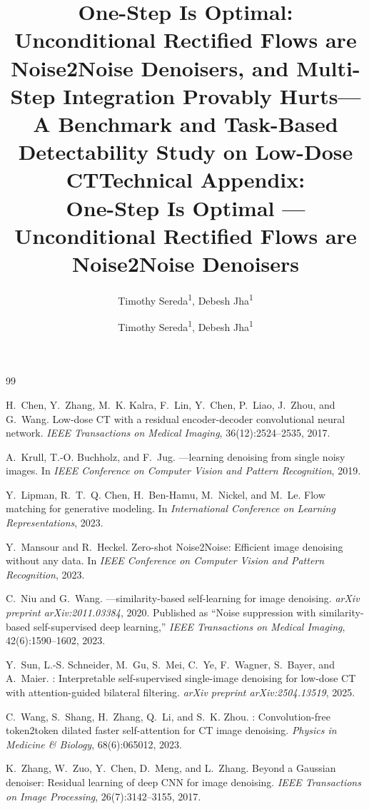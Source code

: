 \documentclass[letterpaper]{article} %
\title{One-Step Is Optimal: Unconditional Rectified Flows are\\
       Noise2Noise Denoisers, and Multi-Step Integration Provably Hurts---\\
       A Benchmark and Task-Based Detectability Study on Low-Dose CT}
\author{
    Timothy Sereda\textsuperscript{1},
    Debesh Jha\textsuperscript{1}
}
\begin{document}
\title{Technical Appendix:\\ One-Step Is Optimal --- Unconditional Rectified
       Flows are Noise2Noise Denoisers}
\author{
    Timothy Sereda\textsuperscript{1},
    Debesh Jha\textsuperscript{1}
}
\maketitle




\begin{thebibliography}{99}

H.~Chen, Y.~Zhang, M.~K. Kalra, F.~Lin, Y.~Chen, P.~Liao, J.~Zhou, and
  G.~Wang.
\newblock Low-dose {CT} with a residual encoder-decoder convolutional neural
  network.
\newblock \emph{IEEE Transactions on Medical Imaging}, 36(12):2524--2535, 2017.

A.~Krull, T.-O. Buchholz, and F.~Jug.
---learning denoising from single noisy images.
\newblock In \emph{IEEE Conference on Computer Vision and Pattern Recognition},
  2019.

Y.~Lipman, R.~T.~Q. Chen, H.~Ben-Hamu, M.~Nickel, and M.~Le.
\newblock Flow matching for generative modeling.
\newblock In \emph{International Conference on Learning Representations}, 2023.

Y.~Mansour and R.~Heckel.
\newblock Zero-shot {Noise2Noise}: Efficient image denoising without any data.
\newblock In \emph{IEEE Conference on Computer Vision and Pattern Recognition},
  2023.

C.~Niu and G.~Wang.
---similarity-based self-learning for image denoising.
\newblock \emph{arXiv preprint arXiv:2011.03384}, 2020.
\newblock Published as ``Noise suppression with similarity-based
  self-supervised deep learning,'' \emph{IEEE Transactions on Medical Imaging},
  42(6):1590--1602, 2023.

Y.~Sun, L.-S. Schneider, M.~Gu, S.~Mei, C.~Ye, F.~Wagner, S.~Bayer, and
  A.~Maier.
: Interpretable self-supervised single-image denoising
  for low-dose {CT} with attention-guided bilateral filtering.
\newblock \emph{arXiv preprint arXiv:2504.13519}, 2025.

C.~Wang, S.~Shang, H.~Zhang, Q.~Li, and S.~K. Zhou.
: Convolution-free token2token dilated faster self-attention
  for {CT} image denoising.
\newblock \emph{Physics in Medicine \& Biology}, 68(6):065012, 2023.

K.~Zhang, W.~Zuo, Y.~Chen, D.~Meng, and L.~Zhang.
\newblock Beyond a {G}aussian denoiser: Residual learning of deep {CNN} for
  image denoising.
\newblock \emph{IEEE Transactions on Image Processing}, 26(7):3142--3155, 2017.

\end{thebibliography}
\end{document}
